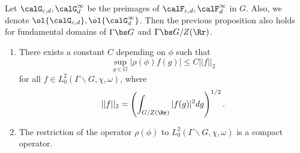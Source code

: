Let $\calG_{c, d}, \calG_{d}^{\infty}$ be the preimages of $\calF_{c, d}, \calF_{d}^{\infty}$ in $G$. Also, we denote $\ol{\calG_{c, d}}, \ol{\calG_{d}^{\infty}}$. Then the previous proposition also holds for fundamental domains of $\Gamma \bs G$ and $\Gamma \bs G/Z(\Rr)$. 
\begin{proposition}
\label{compact}
\begin{enumerate}
\item There exists a constant $C$ depending on $\phi$ such that 
$$
\sup_{g\in G} |\rho(\phi)f(g)| \leq C||f||_{2}
$$
for all $f\in L_{0}^{2}(\Gamma\backslash G, \chi, \omega)$, where 
$$
||f||_{2} = \left(\int_{G/Z(\Rr)} |f(g)|^{2} dg \right)^{1/2}.
$$
\item The restriction of the operator $\rho(\phi)$ to $L_{0}^{2}(\Gamma\backslash G, \chi, \omega)$ is a compact operator. 
\end{enumerate}
\end{proposition}
